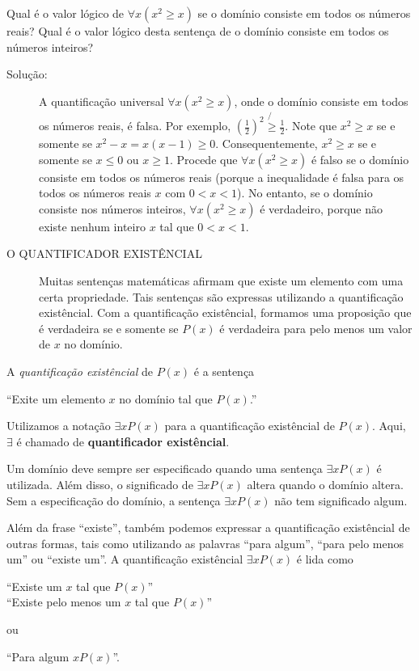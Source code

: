 \begin{exmp}
\label{exem137}
Qual é o valor lógico de $\forall x(x^2 \geq x)$ se o domínio consiste em todos
os números reais? Qual é o valor lógico desta sentença de o domínio consiste em
todos os números inteiros?
\begin{description}
\item[Solução:] A quantificação universal $\forall x(x^2 \geq x)$, onde o
domínio consiste em todos os números reais, é falsa. Por exemplo,
$(\frac{1}{2})^2 \not{\geq} \frac{1}{2}$. Note que $x^2 \geq x$ se e somente se
$x^2 - x = x(x-1) \geq 0$. Consequentemente, $x^2 \geq x$ se e somente se
$x\leq0$ ou $x\geq1$. Procede que $\forall x(x^2\geq x)$ é falso se o domínio
consiste em todos os números reais (porque a inequalidade é falsa para os todos
os números reais $x$ com $0<x<1$). No entanto, se o domínio consiste nos números
inteiros, $\forall x(x^2 \geq x)$ é verdadeiro, porque não existe nenhum inteiro
$x$ tal que $0<x<1$.
\end{description}
\end{exmp}

\begin{description}
\item[O QUANTIFICADOR EXISTÊNCIAL] Muitas sentenças matemáticas afirmam que
existe um elemento com uma certa propriedade. Tais sentenças são expressas
utilizando a quantificação existêncial. Com a quantificação existêncial,
formamos uma proposição que é verdadeira se e somente se $P(x)$ é verdadeira
para pelo menos um valor de $x$ no domínio.
\end{description}

\begin{defn}
\label{def20}
A \emph{quantificação existêncial} de $P(x)$ é a sentença
\begin{center}
``Exite um elemento $x$ no domínio tal que $P(x)$.''
\end{center} 
Utilizamos a notação $\exists xP(x)$ para a quantificação existêncial de $P(x)$.
Aqui, $\exists$ é chamado de \textbf{quantificador existêncial}.
\end{defn}

Um domínio deve sempre ser especificado quando uma sentença $\exists xP(x)$ é
utilizada. Além disso, o significado de $\exists xP(x)$ altera quando o domínio
altera. Sem a especificação do domínio, a sentença $\exists xP(x)$ não tem
significado algum.

Além da frase ``existe'', também podemos expressar a quantificação existêncial
de outras formas, tais como utilizando as palavras ``para algum'', ``para pelo
menos um'' ou ``existe um''. A quantificação existêncial $\exists xP(x)$ é lida
como
\begin{center}
``Existe um $x$ tal que $P(x)$''\\
``Existe pelo menos um $x$ tal que $P(x)$''
\end{center}
ou
\begin{center}
``Para algum $xP(x)$''.
\end{center}

